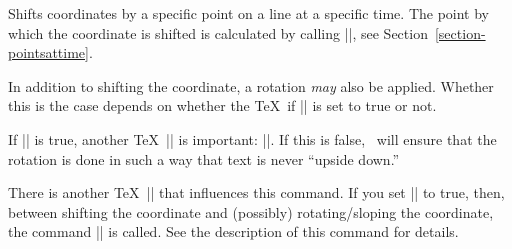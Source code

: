  
\begin{command}{\pgftransformlineattime{}}
  Shifts coordinates by a specific point on a line at a specific
  time. The point by which the coordinate is shifted is calculated by
  calling |\pgfpointlineattime|, see
  Section~\ref{section-pointsattime}.

  In addition to shifting the coordinate, a rotation \emph{may} also
  be applied. Whether this is the case depends on whether the \TeX\ if
  |\ifpgfslopedattime| is set to true or not.
\begin{codeexample}[]
\end{codeexample}
\begin{codeexample}[]
\end{codeexample}
  If |\ifpgfslopedattime| is true, another \TeX\ |\if| is important:
  |\ifpgfallowupsidedowattime|. If this is false, \pgfname\ will
  ensure that the rotation is done in such a way that text is never
  ``upside down.''

  There is another \TeX\ |\if| that influences this command. If you set
  |\ifpgfresetnontranslationattime| to true, then, between
  shifting the coordinate and (possibly) rotating/sloping the
  coordinate, the command |\pgftransformresetnontranslations| is
  called. See the description of this command for details.
\begin{codeexample}[]
\end{codeexample}
\begin{codeexample}[]
\end{codeexample}
\end{command}



